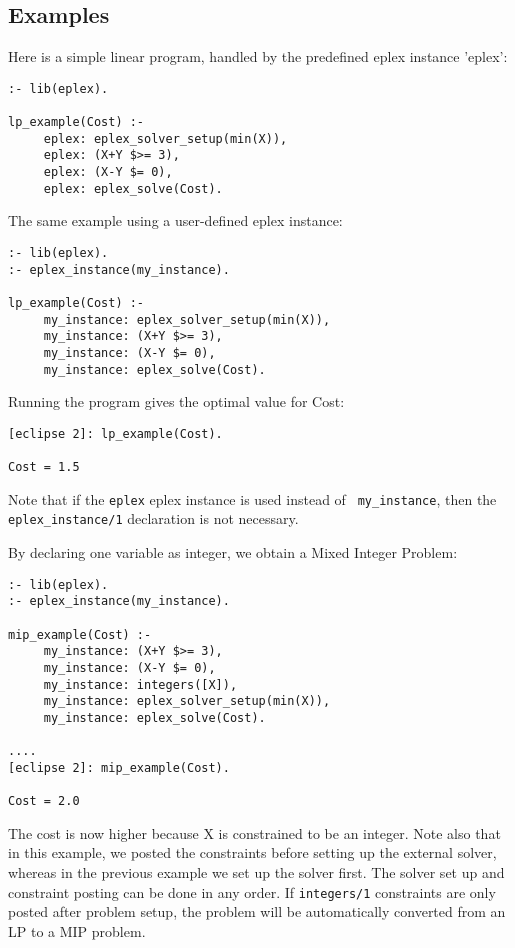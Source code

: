 \subsection{Examples}

Here is a simple linear program, handled by the predefined eplex instance 'eplex':
\begin{verbatim}
:- lib(eplex).

lp_example(Cost) :-
     eplex: eplex_solver_setup(min(X)),
     eplex: (X+Y $>= 3),
     eplex: (X-Y $= 0),
     eplex: eplex_solve(Cost).
\end{verbatim}

The same example using a user-defined eplex instance:
\begin{verbatim}
:- lib(eplex).
:- eplex_instance(my_instance).

lp_example(Cost) :-
     my_instance: eplex_solver_setup(min(X)),
     my_instance: (X+Y $>= 3),
     my_instance: (X-Y $= 0),
     my_instance: eplex_solve(Cost).
\end{verbatim}

Running the program gives the optimal value for Cost:

\begin{verbatim}
[eclipse 2]: lp_example(Cost).

Cost = 1.5
\end{verbatim}

Note that if the {\tt eplex} eplex instance is used instead of {\tt
my_instance}, then the {\tt eplex_instance/1} declaration is not
necessary.


By declaring one variable as integer, we obtain a Mixed Integer Problem:

\begin{verbatim}
:- lib(eplex).
:- eplex_instance(my_instance).

mip_example(Cost) :-
     my_instance: (X+Y $>= 3),
     my_instance: (X-Y $= 0),
     my_instance: integers([X]),
     my_instance: eplex_solver_setup(min(X)),
     my_instance: eplex_solve(Cost).

....
[eclipse 2]: mip_example(Cost).

Cost = 2.0
\end{verbatim}

The cost is now higher because X is constrained to be an integer. Note also
that in this example, we posted the constraints before setting up the 
external solver, whereas in the previous example we set up the solver
first. The solver set up and constraint posting can be done in
any order. If {\tt integers/1} constraints are only posted after problem
setup, the problem will be automatically converted from an LP to a MIP
problem. 

